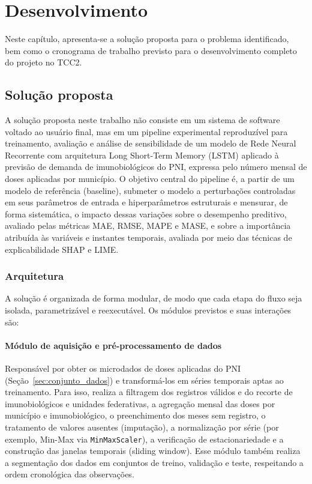 \documentclass[
    12pt,                %
    openright,           %
    oneside,             %
    a4paper,             %
    english,             %
    brazil               %
]{abntex2}
\begin{document}
\chapter{Desenvolvimento}
\label{cap:desenvolvimento}

Neste capítulo, apresenta-se a solução proposta para o problema identificado, bem como o cronograma de trabalho previsto para o desenvolvimento completo do projeto no TCC2.

\section{Solução proposta}
\label{sec:solucao}

A solução proposta neste trabalho não consiste em um sistema de software voltado ao usuário final, mas em um pipeline experimental reproduzível para treinamento, avaliação e análise de sensibilidade de um modelo de Rede Neural Recorrente com arquitetura Long Short-Term Memory (LSTM) aplicado à previsão de demanda de imunobiológicos do PNI, expressa pelo número mensal de doses aplicadas por município. O objetivo central do pipeline é, a partir de um modelo de referência (baseline), submeter o modelo a perturbações controladas em seus parâmetros de entrada e hiperparâmetros estruturais e mensurar, de forma sistemática, o impacto dessas variações sobre o desempenho preditivo, avaliado pelas métricas MAE, RMSE, MAPE e MASE, e sobre a importância atribuída às variáveis e instantes temporais, avaliada por meio das técnicas de explicabilidade SHAP e LIME.

\subsection{Arquitetura}
\label{subsec:arquitetura}

A solução é organizada de forma modular, de modo que cada etapa do fluxo seja isolada, parametrizável e reexecutável. Os módulos previstos e suas interações são:

\subsubsection{Módulo de aquisição e pré-processamento de dados}

Responsável por obter os microdados de doses aplicadas do PNI (Seção~\ref{sec:conjunto_dados}) e transformá-los em séries temporais aptas ao treinamento. Para isso, realiza a filtragem dos registros válidos e do recorte de imunobiológicos e unidades federativas, a agregação mensal das doses por município e imunobiológico, o preenchimento dos meses sem registro, o tratamento de valores ausentes (imputação), a normalização por série (por exemplo, Min-Max via \texttt{MinMaxScaler}), a verificação de estacionariedade e a construção das janelas temporais (sliding window). Esse módulo também realiza a segmentação dos dados em conjuntos de treino, validação e teste, respeitando a ordem cronológica das observações.
\end{document}
